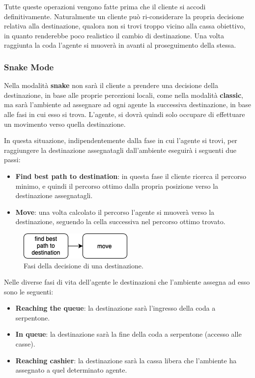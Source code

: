 Tutte queste operazioni vengono fatte prima che il cliente si accodi definitivamente. Naturalmente un cliente può ri-considerare la propria decisione relativa alla destinazione, qualora non si trovi troppo vicino alla cassa obiettivo, in quanto renderebbe poco realistico il cambio di destinazione. Una volta raggiunta la coda l'agente si muoverà in avanti al proseguimento della stessa.

\subsubsection*{Snake Mode}

Nella modalità \textbf{snake} non sarà il cliente a prendere una decisione della destinazione, in base alle proprie percezioni locali, come nella modalità \textbf{classic}, ma sarà l'ambiente ad assegnare ad ogni agente la successiva destinazione, in base alle fasi in cui esso si trova. L'agente, si dovrà quindi solo occupare di effettuare un movimento verso quella destinazione. 

In questa situazione, indipendentemente dalla fase in cui l'agente si trovi, per raggiungere la destinazione assegnatagli dall'ambiente eseguirà i seguenti due passi:

\begin{itemize}
    \item \textbf{Find best path to destination}: in questa fase il cliente ricerca il percorso minimo, e quindi il percorso ottimo dalla propria posizione verso la destinazione assegnatagli.
    \item \textbf{Move}: una volta calcolato il percorso l'agente si muoverà verso la destinazione, seguendo la cella successiva nel percorso ottimo trovato.
\end{itemize}

\begin{figure}[h!]
    \includegraphics[width=0.5\linewidth]{img/decision-snake.png}
    \centering
    \caption{Fasi della decisione di una destinazione.}
\end{figure}

Nelle diverse fasi di vita dell'agente le destinazioni che l'ambiente assegna ad esso sono le seguenti:

\begin{itemize}
    \item \textbf{Reaching the queue}: la destinazione sarà l'ingresso della coda a serpentone.
    \item \textbf{In queue}: la destinazione sarà la fine della coda a serpentone (accesso alle casse).
    \item \textbf{Reaching cashier}: la destinazione sarà la cassa libera che l'ambiente ha assegnato a quel determinato agente.
\end{itemize}
